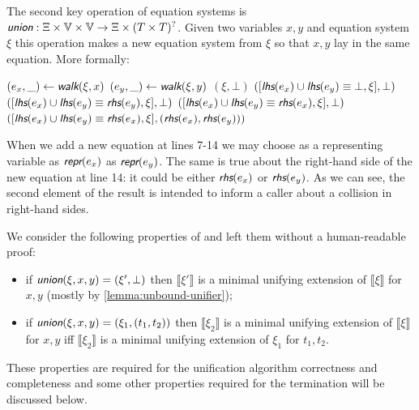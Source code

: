 The second key operation of equation systems is $\union : \Xi \times \V \times \V \rightarrow \Xi \times (T \times T)^?$. Given two variables $x, y$ and equation system $\xi$ this operation makes a new equation system from $\xi$ so that $x, y$ lay in the same equation. More formally:
\begin{algorithmic}[1]
        \State $(e_x, \_) \gets \walk(\xi, x)$
        \State $(e_y, \_) \gets \walk(\xi, y)$
            \State \Return $(\xi, \bot)$
        \Else
                \State \Return $([\lhs(e_x) \cup \lhs(e_y) \equiv \bot, \xi], \bot)$
                \State \Return $([\lhs(e_x) \cup \lhs(e_y) \equiv \rhs(e_y), \xi], \bot)$
                \State \Return $([\lhs(e_x) \cup \lhs(e_y) \equiv \rhs(e_x), \xi], \bot)$
            \Else
                \State \Return $([\lhs(e_x) \cup \lhs(e_y) \equiv \rhs(e_x), \xi],(\rhs(e_x), \rhs(e_y)))$
            \EndIf
        \EndIf
    \EndFunction
\end{algorithmic}

When we add a new equation at lines 7-14 we may choose as a representing variable as $\repr(e_x)$ as $\repr(e_y)$. The same is true about the right-hand side of the new equation at line 14: it could be either $\rhs(e_x)$ or $\rhs(e_y)$. As we can see, the second element of the \union result is intended to inform a caller about a collision in right-hand sides.

We consider the following properties of \union and left them without a human-readable proof:
\begin{itemize}
    \item if $\union(\xi, x, y) = (\xi', \bot)$ then $\llbracket \xi' \rrbracket$ is a minimal unifying extension of $\llbracket \xi \rrbracket$ for $x, y$ (mostly by \autoref{lemma:unbound-unifier});
    \item if $\union(\xi, x, y) = (\xi_1, (t_1, t_2))$ then $\llbracket \xi_2 \rrbracket$ is a minimal unifying extension of $\llbracket \xi \rrbracket$ for $x, y$ iff $\llbracket \xi_2 \rrbracket$ is a minimal unifying extension of $\xi_1$ for $t_1, t_2$.
\end{itemize}

These properties are required for the unification algorithm correctness and completeness and some other properties required for the termination will be discussed below.


